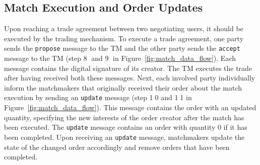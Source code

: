 \subsection{Match Execution and Order Updates}
Upon reaching a trade agreement between two negotiating users, it should be executed by the trading mechanism.
To execute a trade agreement, one party sends the \texttt{propose} message to the TM and the other party sends the \texttt{accept} message to the TM (step \textcircled{8} and \textcircled{9} in Figure~\ref{fig:match_data_flow}).
Each message contains the digital signature of its creator.
The TM executes the trade after having received both these messages.
Next, each involved party individually inform the matchmakers that originally received their order about the match execution by sending an \texttt{update} message (step \textcircled{10} and \textcircled{11} in Figure~\ref{fig:match_data_flow}).
This message contains the order with an updated quantity, specifying the new interests of the order creator after the match has been executed.
The \texttt{update} message contains an order with quantity 0 if it has been completed.
Upon receiving an \texttt{update} message, matchmakers update the state of the changed order accordingly and remove orders that have been completed.


